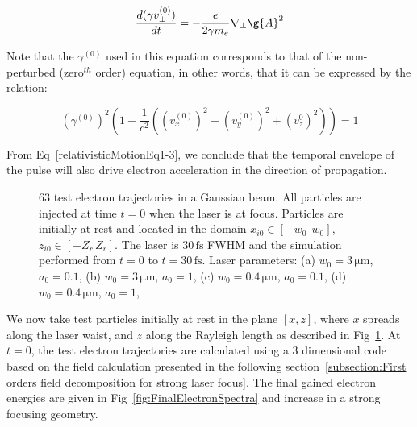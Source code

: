 \begin{equation}
\frac{d(\gamma v_{\bot}^{(0)})}{dt} = -\frac{e}{2\gamma m_e}\nabla_{\bot}\g{A}^2
\end{equation}

\noindent Note that the $\gamma^{(0)}$ used in this equation corresponds to that of the non-perturbed (zero$^{th}$ order) equation, in other words, that it can be expressed by the relation:

$$
(\gamma^{(0)})^2 (1 - \frac{1}{c^2}((v_x^{(0)})^2 + (v_y^{(0)})^2+(v_z^{0})^2)) = 1
$$

\noindent From Eq~\ref{relativisticMotionEq1-3}, we conclude that the temporal envelope of the pulse will also drive electron acceleration in the direction of propagation.

%
%

\begin{figure}[H]
\caption{\label{fig:poneffect_sim}63 test electron trajectories in a Gaussian beam. All particles are injected at time $t=0$ when the laser is at focus. Particles are initially at rest and located in the domain $x_{i0}\in [-w_0 \ \ w_0]$, $z_{i0} \in [-Z_r \,Z_r]$. The laser is $30\,\mathrm {fs}$ FWHM and the simulation performed from $t=0$ to $t =30\,\mathrm{fs}$. Laser parameters:  (a) $w_0 = 3\,\mathrm{\mu m}$, $a_0 = 0.1$, (b) $w_0 = 3\,\mathrm{\mu m}$, $a_0 = 1$, (c) $ w_0 = 0.4\,\mathrm{\mu m}$, $a_0 = 0.1$, (d) $w_0 = 0.4\,\mathrm{\mu m}$, $a_0 = 1$,}
\end{figure}

\noindent  We now take test particles initially at rest in the plane $[x,z]$, where $x$ spreads along the laser waist, and $z$ along the Rayleigh length as described in Fig~\ref{fig:poneffect_sim}. At $t=0$, the test electron trajectories are calculated using a 3 dimensional code based on the field calculation presented in the following section~\ref{subsection:First orders field decomposition for strong laser focus}.  The final gained electron energies are given in Fig~\ref{fig:FinalElectronSpectra} and increase in a strong focusing geometry. 

